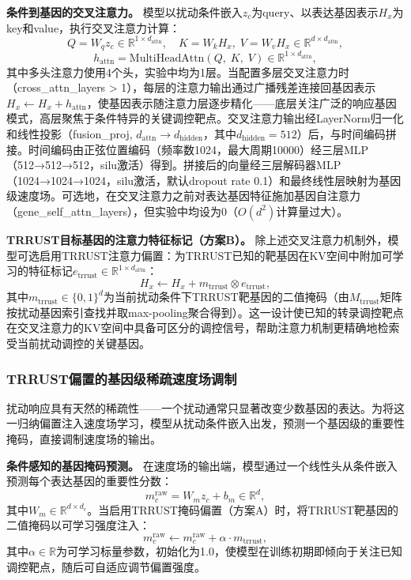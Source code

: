 \textbf{条件到基因的交叉注意力。} 模型以扰动条件嵌入$z_c$为query、以表达基因表示$H_x$为key和value，执行交叉注意力计算：
\begin{equation}
Q=W_qz_c\in\mathbb{R}^{1\times d_{\mathrm{attn}}},\quad
K=W_kH_x,\;V=W_vH_x\in\mathbb{R}^{d\times d_{\mathrm{attn}}},
\label{eq:cross_attn_qkv}
\end{equation}
\begin{equation}
h_{\mathrm{attn}}=\mathrm{MultiHeadAttn}(Q,\;K,\;V)\in\mathbb{R}^{1\times d_{\mathrm{attn}}},
\label{eq:cross_attn}
\end{equation}
其中多头注意力使用4个头，实验中均为1层。当配置多层交叉注意力时（cross\_attn\_layers > 1），每层的注意力输出通过广播残差连接回基因表示$H_x\leftarrow H_x+h_{\mathrm{attn}}$，使基因表示随注意力层逐步精化——底层关注广泛的响应基因模式，高层聚焦于条件特异的关键调控靶点。交叉注意力输出经LayerNorm归一化和线性投影（fusion\_proj, $d_{\mathrm{attn}}\to d_{\mathrm{hidden}}$，其中$d_{\mathrm{hidden}}=512$）后，与时间编码拼接。时间编码由正弦位置编码（频率数1024，最大周期10000）经三层MLP（512→512→512，silu激活）得到。拼接后的向量经三层解码器MLP（1024→1024→1024，silu激活，默认dropout rate 0.1）和最终线性层映射为基因级速度场。可选地，在交叉注意力之前对表达基因特征施加基因自注意力（gene\_self\_attn\_layers），但实验中均设为0（$O(d^2)$计算量过大）。

\textbf{TRRUST目标基因的注意力特征标记（方案B）。} 除上述交叉注意力机制外，模型可选启用TRRUST注意力偏置：为TRRUST已知的靶基因在KV空间中附加可学习的特征标记$e_{\mathrm{trrust}}\in\mathbb{R}^{1\times d_{\mathrm{attn}}}$：
\begin{equation}
H_x\leftarrow H_x + m_{\mathrm{trrust}}\otimes e_{\mathrm{trrust}},
\label{eq:trrust_attn_bias}
\end{equation}
其中$m_{\mathrm{trrust}}\in\{0,1\}^{d}$为当前扰动条件下TRRUST靶基因的二值掩码（由$M_{\mathrm{trrust}}$矩阵按扰动基因索引查找并取max-pooling聚合得到）。这一设计使已知的转录调控靶点在交叉注意力的KV空间中具备可区分的调控信号，帮助注意力机制更精确地检索受当前扰动调控的关键基因。

\subsubsection{TRRUST偏置的基因级稀疏速度场调制}

扰动响应具有天然的稀疏性——一个扰动通常只显著改变少数基因的表达。为将这一归纳偏置注入速度场学习，模型从扰动条件嵌入出发，预测一个基因级的重要性掩码，直接调制速度场的输出。

\textbf{条件感知的基因掩码预测。} 在速度场的输出端，模型通过一个线性头从条件嵌入预测每个表达基因的重要性分数：
\begin{equation}
m_c^{\mathrm{raw}}=W_mz_c+b_m\in\mathbb{R}^{d},
\label{eq:mask_raw}
\end{equation}
其中$W_m\in\mathbb{R}^{d\times d_c}$。当启用TRRUST掩码偏置（方案A）时，将TRRUST靶基因的二值掩码以可学习强度注入：
\begin{equation}
m_c^{\mathrm{raw}}\leftarrow m_c^{\mathrm{raw}} + \alpha\cdot m_{\mathrm{trrust}},
\label{eq:mask_trrust}
\end{equation}
其中$\alpha\in\mathbb{R}$为可学习标量参数，初始化为1.0，使模型在训练初期即倾向于关注已知调控靶点，随后可自适应调节偏置强度。

